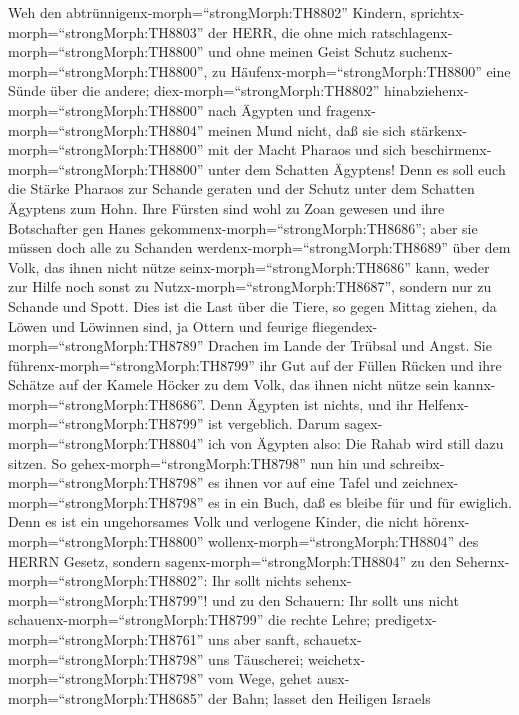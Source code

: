  Weh den abtrünnigenx-morph=``strongMorph:TH8802'' Kindern,
sprichtx-morph=``strongMorph:TH8803'' der HERR, die ohne mich
ratschlagenx-morph=``strongMorph:TH8800'' und ohne meinen Geist Schutz
suchenx-morph=``strongMorph:TH8800'', zu
Häufenx-morph=``strongMorph:TH8800'' eine Sünde über die andere;
 diex-morph=``strongMorph:TH8802''
hinabziehenx-morph=``strongMorph:TH8800'' nach Ägypten und
fragenx-morph=``strongMorph:TH8804'' meinen Mund nicht, daß sie sich
stärkenx-morph=``strongMorph:TH8800'' mit der Macht Pharaos und sich
beschirmenx-morph=``strongMorph:TH8800'' unter dem Schatten Ägyptens!
 Denn es soll euch die Stärke Pharaos zur Schande geraten
und der Schutz unter dem Schatten Ägyptens zum Hohn.  Ihre
Fürsten sind wohl zu Zoan gewesen und ihre Botschafter gen Hanes
gekommenx-morph=``strongMorph:TH8686'';  aber sie müssen
doch alle zu Schanden werdenx-morph=``strongMorph:TH8689'' über dem
Volk, das ihnen nicht nütze seinx-morph=``strongMorph:TH8686'' kann,
weder zur Hilfe noch sonst zu Nutzx-morph=``strongMorph:TH8687'',
sondern nur zu Schande und Spott.  Dies ist die Last über
die Tiere, so gegen Mittag ziehen, da Löwen und Löwinnen sind, ja Ottern
und feurige fliegendex-morph=``strongMorph:TH8789'' Drachen im Lande der
Trübsal und Angst. Sie führenx-morph=``strongMorph:TH8799'' ihr Gut auf
der Füllen Rücken und ihre Schätze auf der Kamele Höcker zu dem Volk,
das ihnen nicht nütze sein kannx-morph=``strongMorph:TH8686''.
 Denn Ägypten ist nichts, und ihr
Helfenx-morph=``strongMorph:TH8799'' ist vergeblich. Darum
sagex-morph=``strongMorph:TH8804'' ich von Ägypten also: Die Rahab wird
still dazu sitzen.  So gehex-morph=``strongMorph:TH8798''
nun hin und schreibx-morph=``strongMorph:TH8798'' es ihnen vor auf eine
Tafel und zeichnex-morph=``strongMorph:TH8798'' es in ein Buch, daß es
bleibe für und für ewiglich.  Denn es ist ein ungehorsames
Volk und verlogene Kinder, die nicht hörenx-morph=``strongMorph:TH8800''
wollenx-morph=``strongMorph:TH8804'' des HERRN Gesetz, 
sondern sagenx-morph=``strongMorph:TH8804'' zu den
Sehernx-morph=``strongMorph:TH8802'': Ihr sollt nichts
sehenx-morph=``strongMorph:TH8799''! und zu den Schauern: Ihr sollt uns
nicht schauenx-morph=``strongMorph:TH8799'' die rechte Lehre;
predigetx-morph=``strongMorph:TH8761'' uns aber sanft,
schauetx-morph=``strongMorph:TH8798'' uns Täuscherei; 
weichetx-morph=``strongMorph:TH8798'' vom Wege, gehet
ausx-morph=``strongMorph:TH8685'' der Bahn; lasset den Heiligen Israels
